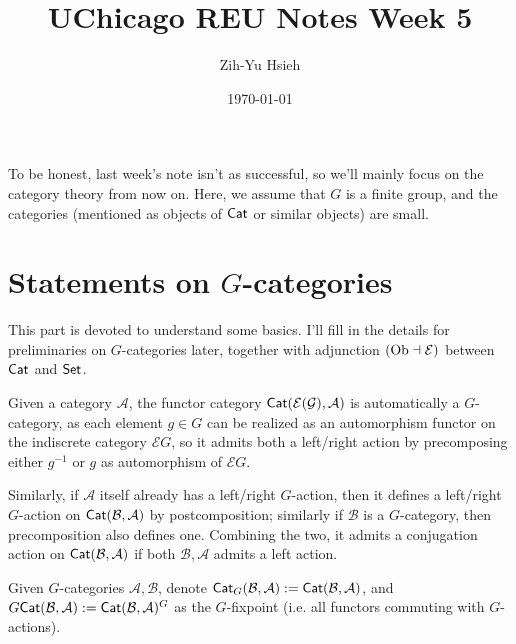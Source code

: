 \documentclass{article}
\title{UChicago REU Notes Week 5}
\author{Zih-Yu Hsieh}
\date{\today}
\begin{document}
\maketitle
\tableofcontents

To be honest, last week's note isn't as successful, so we'll mainly focus on the category theory from now on. Here, we assume that $G$ is a finite group, and the categories (mentioned as objects of $\mathsf{Cat}$ or similar objects) are small.

\section{Statements on $G$-categories}

This part is devoted to understand some basics. I'll fill in the details for preliminaries on $G$-categories later, together with adjunction $(\mathrm{Ob}\dashv \mathcal{E})$ between $\mathsf{Cat}$ and $\mathsf{Set}$.

Given a category $\mathcal{A}$, the functor category $\mathsf{Cat}(\mathcal{\mathcal{E}(G)},\mathcal{A})$ is automatically a $G$-category, as each element $g\in G$ can be realized as an automorphism functor on the indiscrete category $\mathcal{E}G$, so it admits both a left/right action by precomposing either $g^{-1}$ or $g$ as automorphism of $\mathcal{E}G$.

Similarly, if $\mathcal{A}$ itself already has a left/right $G$-action, then it defines a left/right $G$-action on $\mathsf{Cat}(\mathcal{B},\mathcal{A})$ by postcomposition; similarly if $\mathcal{B}$ is a $G$-category, then precomposition also defines one. Combining the two, it admits a conjugation action on $\mathsf{Cat}(\mathcal{B},\mathcal{A})$ if both $\mathcal{B},\mathcal{A}$ admits a left action.

Given $G$-categories $\mathcal{A},\mathcal{B}$, denote $\mathsf{Cat}_G(\mathcal{B},\mathcal{A}):= \mathsf{Cat}(\mathcal{B},\mathcal{A})$, and $G\mathsf{Cat}(\mathcal{B},\mathcal{A}):=\mathsf{Cat}(\mathcal{B},\mathcal{A})^G$ as the $G$-fixpoint (i.e. all functors commuting with $G$-actions).

\hfil
\end{document}
